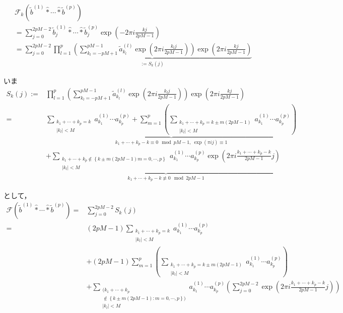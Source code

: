 \documentclass[11pt,a4paper,titlepage]{jsreport}
\theoremstyle{definition}
\begin{document}
\begin{description}
\begin{align*}
       & \mathcal{F}_k \left( \tilde{b}^{(1)} \hat{*} \cdots \hat{*} \tilde{b}^{(p)} \right)                                                                                                                            \\
       & = \sum_{j=0}^{2pM-2}  \tilde{b}^{(1)}_j \hat{*} \cdots \hat{*} \tilde{b}^{(p)}_j \exp\left(-2\pi i \frac{kj}{2pM-1}\right)                                                                                     \\
       & = \sum_{j=0}^{2pM-2} \underbrace{ \prod_{l=1}^p  \left( \sum_{k_l=-pM+1}^{pM-1} \tilde{a}_{k_l}^{(l)} \exp\left(2\pi i \frac{k_lj}{2pM-1} \right) \right) \exp\left(2\pi i \frac{kj}{2pM-1}\right)}_{:=S_k(j)}
    \end{align*}

    いま
    \begin{align*}
      S_k(j) := & \prod_{l=1}^p  \left( \sum_{k_l=-pM+1}^{pM-1} \tilde{a}_{k_l}^{(l)} \exp\left(2\pi i \frac{k_lj}{2pM-1} \right) \right) \exp\left(2\pi i \frac{kj}{2pM-1}\right) \\
      =         & \underbrace{\sum_{\substack{{k_1+\cdots+k_p=k}                                                                                                                   \\ {|k_l|<M}}} a_{k_1}^{(1)}\cdots a_{k_p}^{(p)} + \sum_{m=1}^{p} \left( \sum_{\substack{k_1+\cdots+k_p=k \pm m(2pM-1) \\ |k_l|<M}} a_{k_1}^{(1)} \cdots a_{k_p}^{(p)} \right) }_{k_1+\cdots+k_p-k \equiv 0 \mod pM-1,\ \exp(\pi ij)\equiv 1} \\
                & + \underbrace{\sum_{\substack{k_1+\cdots+k_p \notin \left\{ k \pm m(2pM-1)m=0,\cdots,p \right\}                                                                  \\ |k_l|<M}} a_{k_1}^{(1)} \cdots a_{k_p}^{(p)} \exp \left( 2\pi i \frac{k_1+\cdots+k_p-k}{2pM-1}j \right)}_{k_1+\cdots+k_p-k \not\equiv 0 \mod 2pM-1}
    \end{align*}

    として，
    \begin{align*}
      \mathcal{F}\left(\tilde{b}^{(1)} \hat* \cdots \hat* \tilde{b}^{(p)}\right) = & \sum_{j=0}^{2pM-2} S_k(j)  \\
      = & (2pM-1) \sum_{\substack{{k_1+\cdots+k_p=k} \\ {|k_l|<M}}} a_{k_1}^{(1)}\cdots a_{k_p}^{(p)} \\
      & + (2pM-1) \sum_{m=1}^{p} \left( \sum_{\substack{k_1+\cdots+k_p=k \pm m(2pM-1) \\ |k_l|<M}} a_{k_1}^{(1)} \cdots a_{k_p}^{(p)} \right)  \\
      & +  \sum_{\substack{( k_1+\cdots+k_p  \\ \notin \left\{ k \pm m(2pM-1) :m=0,\cdots,p\right\} ) \\ |k_l|<M}} a_{k_1}^{(1)} \cdots a_{k_p}^{(p)} \left( \sum_{j=0}^{2pM-2} \exp \left( 2\pi i \frac{k_1+\cdots+k_p-k}{2pM-1}j \right)\right)
    \end{align*}


\end{description}
\end{document}

